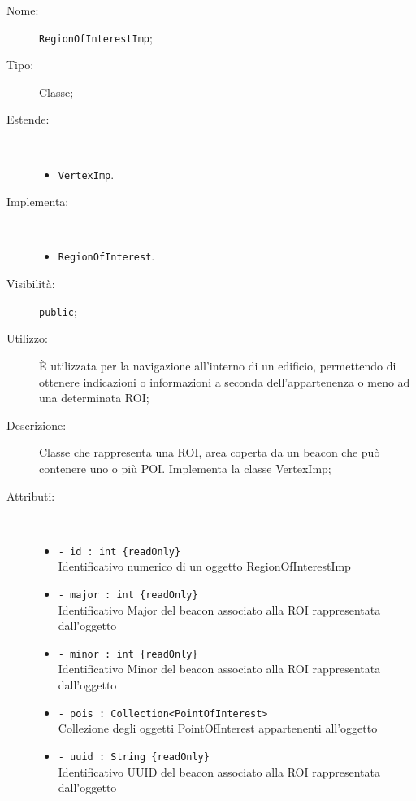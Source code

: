 \documentclass[../DefinizioneDiProdotto.tex]{subfiles}
\begin{document}
\begin{description}
	\item[Nome:] \texttt{RegionOfInterestImp};
	\item[Tipo:] Classe;
	\item[Estende:] \
	\begin{itemize}
		\item \texttt{VertexImp}.
	\end{itemize}
	\item[Implementa:] \
	\begin{itemize}
		\item \texttt{RegionOfInterest}.
		
	\end{itemize}
	\item[Visibilità:] \texttt{public};
	\item[Utilizzo:] È utilizzata per la navigazione all'interno di un edificio, permettendo di ottenere indicazioni o informazioni a seconda dell'appartenenza o meno ad una determinata ROI;
	\item[Descrizione:] Classe che rappresenta una ROI, area coperta da un beacon che può contenere uno o più POI. Implementa la classe VertexImp;
	\item[Attributi:] \
	\begin{itemize}
		\item \texttt{- id : int \{readOnly\}}\\
		Identificativo numerico di un oggetto RegionOfInterestImp
		
		\item \texttt{- major : int \{readOnly\}}\\
		Identificativo Major del beacon associato alla ROI rappresentata dall'oggetto
		
		\item \texttt{- minor : int \{readOnly\}}\\
		Identificativo Minor del beacon associato alla ROI rappresentata dall'oggetto
		
		\item \texttt{- pois : Collection<PointOfInterest>}\\
		Collezione degli oggetti PointOfInterest appartenenti all'oggetto
		
		\item \texttt{- uuid : String \{readOnly\}}\\
		Identificativo UUID del beacon associato alla ROI rappresentata dall'oggetto
		

\end{itemize}
\end{description}
\end{document}
